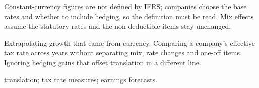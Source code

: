 \begin{qfmethod}
 Constant-currency figures are not defined by IFRS; companies choose the base rates and whether to include hedging, so the definition must be read. Mix effects assume the statutory rates and the non-deductible items stay unchanged.

 Extrapolating growth that came from currency. Comparing a company's effective tax rate across years without separating mix, rate changes and one-off items. Ignoring hedging gains that offset translation in a different line.

 \hyperref[meth:currency-translation-methods]{translation}; \hyperref[meth:tax-rate-measures]{tax rate measures}; \hyperref[meth:ratio-based-earnings-forecast]{earnings forecasts}.

\end{qfmethod}
